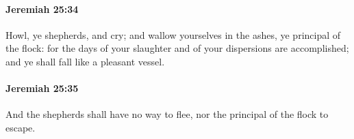 		\paragraph{Jeremiah 25:34} %
			\label{JEREMIAH-25-34}

			Howl, ye shepherds, and cry; and wallow yourselves in the ashes, ye principal of the flock: for the days of your slaughter and of your dispersions are accomplished; and ye shall fall like a pleasant vessel.


		\paragraph{Jeremiah 25:35} %
			\label{JEREMIAH-25-35}

			And the shepherds shall have no way to flee, nor the principal of the flock to escape.


